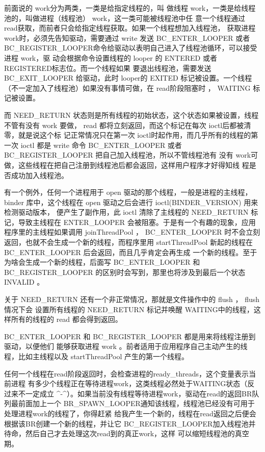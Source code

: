 \documentclass[a4paper,11pt]{article}
\begin{document}
前面说的 work分为两类，一类是给指定线程的，叫
做线程 work，一类是给线程池的，叫做进程（线程池） work，这一类可能被线程池中任
意一个线程通过 read获取，而前者只会给指定线程获取。如果一个线程想加入线程池，
获取进程 work时，必须先告知驱动，需要通过 write 发送 BC_ENTER_LOOPER 或者
BC_REGISTER_LOOPER命令给驱动以表明自己进入了线程池循环，可以接受进程 work，驱
动会根据命令设置线程的 looper 的 ENTERED 或者 REGISTERED标志位。而一个线程如果
要退出线程池，需要发送 BC_EXIT_LOOPER 给驱动，此时 looper的 EXITED
标记被设置。一个线程（不一定加入了线程池）如果没有事情可做，在 read阶段阻塞时
， WAITING 标记被设置。


而 NEED_RETURN 状态则是所有线程的初始状态，这个状态如果被设置，线程不管有没有
work 要做， read 都将立刻返回，而这个标记在每次 ioctl后都被清零，就是说这个标
记正常情况只在第一次 ioctl时起作用，而几乎所有的线程的第一次 ioctl 都是 write
命令 BC_ENTER_LOOPER 或者BC_REGISTER_LOOPER 把自己加入线程池，所以不管线程池有
没有 work可做，这些线程在把自己注册到线程池后都会返回，这样用户程序才好得知线
程是否成功加入线程池。

有一个例外，任何一个进程用于 open 驱动的那个线程，一般是进程的主线程， binder
库中，这个线程在 open 驱动之后会进行 ioctl(BINDER_VERSION) 用来检测驱动版本，
便产生了副作用，此 ioctl 清除了主线程的 NEED_RETURN 标记，导致主线程在 ENTER_LOOPER
会被阻塞。于是有一个有趣的现象，应用程序里的主线程如果调用 joinThreadPool ，
BC_ENTER_LOOPER 时不会立刻返回，也就不会生成一个新的线程，而程序里用
startThreadPool 新起的线程在 BC_ENTER_LOOPER 后会返回，而且几乎肯定会再生成
一个新的线程。至于为啥会生成一个新的线程，后面写 BC_ENTER_LOOPER 和
 BC_REGISTER_LOOPER 的区别时会写到，那里也将涉及到最后一个状态 INVALID 。

关于 NEED_RETURN 还有一个非正常情况，那就是文件操作中的 flush ， flush情况下会
设置所有线程的 NEED_RETURN 标记并唤醒 WAITING中的线程，这样所有的线程的 read
都会得到返回。


BC_ENTER_LOOPER 和 BC_REGISTER_LOOPER 都是用来将线程注册到驱动，以便他们
能够获取进程 work 。前者适用于应用程序自己主动产生的线程，比如主线程以及
startThreadPool 产生的第一个线程。

任何一个线程在read阶段返回时，会检查进程的ready_threads，这个变量表示当前进程
有多少个线程正在等待进程work，这类线程必然处于WAITING状态（反过来不一定成立
\^{}-\^{}）。如果当前没有线程等待进程work，驱动在read的返回BR队列最前面加上一个
BR_SPAWN_LOOPER通知该线程，线程池已经没有可用于处理进程work的线程了，你得赶紧
给我产生一个新的，线程在read返回之后便会根据该BR创建一个新的线程，并让它
BC_REGISTER_LOOPER加入线程池并待命，然后自己才去处理这次read到的真正work，这样
可以缩短线程池的真空期。
\end{document}
